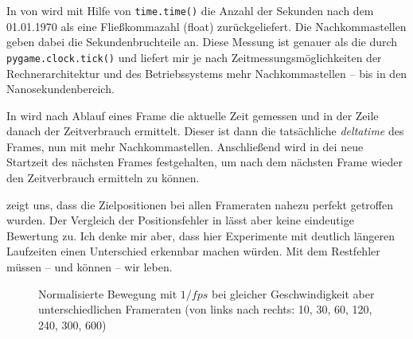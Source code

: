 In  von  wird mit Hilfe von \texttt{time.time()} die Anzahl der Sekunden nach dem 01.01.1970 als eine Fließkommazahl (float) zurückgeliefert. Die Nachkommastellen geben dabei die Sekundenbruchteile an. Diese Messung ist genauer als die durch \texttt{pygame.clock.tick()} und liefert mir je nach Zeitmessungsmöglichkeiten der Rechnerarchitektur und des Betriebssystems mehr Nachkommastellen -- bis in den Nanosekundenbereich.

In  wird nach Ablauf eines Frame die aktuelle Zeit gemessen und in der Zeile danach der Zeitverbrauch ermittelt. Dieser ist dann die tatsächliche \emph{deltatime} des Frames, nun mit mehr Nachkommastellen. Anschließend wird in  dei neue Startzeit des nächsten Frames festgehalten, um nach dem nächsten Frame wieder den Zeitverbrauch ermitteln zu können.

 zeigt uns, dass die Zielpositionen bei allen Frameraten nahezu perfekt getroffen wurden. Der Vergleich der Positionsfehler in  lässt aber keine eindeutige Bewertung zu. Ich denke mir aber, dass hier Experimente mit deutlich längeren Laufzeiten einen Unterschied erkennbar machen würden. Mit dem Restfehler müssen -- und können -- wir leben.


\newpage 
\begin{figure}[p] 
	\begin{center}
		\caption[Normalisierte Bewegung mit $1/fps$]{Normalisierte Bewegung mit $1/fps$ bei gleicher Geschwindigkeit aber unterschiedlichen Frameraten (von links nach rechts: 10, 30, 60, 120, 240, 300, 600)}\label{fpsbewegung01}
	\end{center}
\end{figure}


